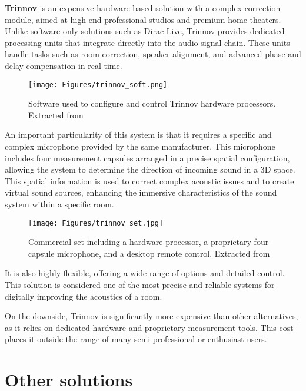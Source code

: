 \textbf{Trinnov}\cite{trinnov} is an expensive hardware-based solution with a complex correction module, aimed at high-end professional studios and premium home theaters. Unlike software-only solutions such as Dirac Live, Trinnov provides dedicated processing units that integrate directly into the audio signal chain. These units handle tasks such as room correction, speaker alignment, and advanced phase and delay compensation in real time.

\begin{figure}[H]
	\centering
	\texttt{[image: Figures/trinnov\_soft.png]}
	\caption[Software used in the Trinnov system]{Software used to configure and control Trinnov hardware processors. Extracted from \cite{trinnov_image}}
	\label{fig:trinnov_soft}
\end{figure}

An important particularity of this system is that it requires a specific and complex microphone provided by the same manufacturer. This microphone includes four measurement capsules arranged in a precise spatial configuration, allowing the system to determine the direction of incoming sound in a 3D space. This spatial information is used to correct complex acoustic issues and to create virtual sound sources, enhancing the immersive characteristics of the sound system within a specific room.

\begin{figure}[H]
	\centering
	\texttt{[image: Figures/trinnov\_set.jpg]}
	\caption[Trinnov commercial set]{Commercial set including a hardware processor, a proprietary four-capsule microphone, and a desktop remote control. Extracted from \cite{trinnov_image2}}
	\label{fig:trinnov_hard}
\end{figure}

It is also highly flexible, offering a wide range of options and detailed control. This solution is considered one of the most precise and reliable systems for digitally improving the acoustics of a room.

On the downside, Trinnov is significantly more expensive than other alternatives, as it relies on dedicated hardware and proprietary measurement tools. This cost places it outside the range of many semi-professional or enthusiast users.


\section{Other solutions}

